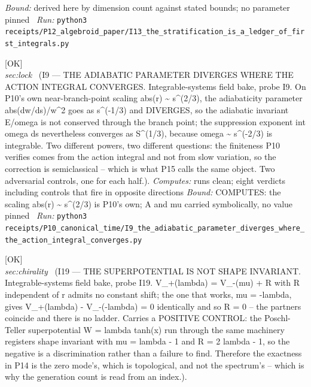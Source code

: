 \begin{description}
 \emph{Bound:} derived here by dimension count against stated bounds; no parameter pinned
\ \emph{Run:} \texttt{python3 receipts/P12\_algebroid\_paper/I13\_the\_stratification\_is\_a\_ledger\_of\_first\_integrals.py}
\item[\label{rcpt:I9_the_adiabatic_parameter_diverges_where_the_action_integral_converges}\texttt{I9\_the\_adiabatic\_parameter\_diverges\_where\_the\_action\_integral\_converges}]\hfill\textsf{[OK]}\\
\textit{sec:lock} \ (I9 --- THE ADIABATIC PARAMETER DIVERGES WHERE THE ACTION INTEGRAL CONVERGES. Integrable-systems field bake, probe I9. On P10's own near-branch-point scaling abs(r) \textasciitilde{} s\textasciicircum{}(2/3), the adiabaticity parameter abs(dw/ds)/w\textasciicircum{}2 goes as s\textasciicircum{}(-1/3) and DIVERGES, so the adiabatic invariant E/omega is not conserved through the branch point; the suppression exponent int omega ds nevertheless converges as S\textasciicircum{}(1/3), because omega \textasciitilde{} s\textasciicircum{}(-2/3) is integrable. Two different powers, two different questions: the finiteness P10 verifies comes from the action integral and not from slow variation, so the correction is semiclassical -- which is what P15 calls the same object. Two adversarial controls, one for each half.). 
\emph{Computes:} runs clean; eight verdicts including controls that fire in opposite directions
 \emph{Bound:} COMPUTES: the scaling abs(r) \textasciitilde{} s\textasciicircum{}(2/3) is P10's own; A and mu carried symbolically, no value pinned
\ \emph{Run:} \texttt{python3 receipts/P10\_canonical\_time/I9\_the\_adiabatic\_parameter\_diverges\_where\_the\_action\_integral\_converges.py}
\item[\label{rcpt:I19_the_superpotential_is_not_shape_invariant}\texttt{I19\_the\_superpotential\_is\_not\_shape\_invariant}]\hfill\textsf{[OK]}\\
\textit{sec:chirality} \ (I19 --- THE SUPERPOTENTIAL IS NOT SHAPE INVARIANT. Integrable-systems field bake, probe I19. V\_+(lambda) = V\_-(mu) + R with R independent of r admits no constant shift; the one that works, mu = -lambda, gives V\_+(lambda) - V\_-(-lambda) = 0 identically and so R = 0 -- the partners coincide and there is no ladder. Carries a POSITIVE CONTROL: the Poschl-Teller superpotential W = lambda tanh(x) run through the same machinery registers shape invariant with mu = lambda - 1 and R = 2 lambda - 1, so the negative is a discrimination rather than a failure to find. Therefore the exactness in P14 is the zero mode's, which is topological, and not the spectrum's -- which is why the generation count is read from an index.). 

\end{description}
